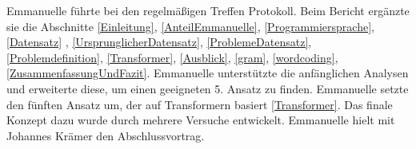 \label{AnteilEmmanuelle}
Emmanuelle führte bei den regelmäßigen Treffen Protokoll. 
Beim Bericht ergänzte sie die Abschnitte \ref{Einleitung}, \ref{AnteilEmmanuelle}, \ref{Programmiersprache}, \ref{Datensatz} , \ref{UrsprunglicherDatensatz}, \ref{ProblemeDatensatz}, \ref{Problemdefinition}, \ref{Transformer}, \ref{Ausblick}, \ref{gram}, \ref{wordcoding}, \ref{ZusammenfassungUndFazit}.
Emmanuelle unterstützte die anfänglichen Analysen und erweiterte diese, um einen geeigneten 5. Ansatz zu finden.
Emmanuelle setzte den fünften Ansatz um, der auf Transformern basiert \ref{Transformer}. Das finale Konzept dazu wurde durch mehrere Versuche entwickelt.
Emmanuelle hielt mit Johannes Krämer den Abschlussvortrag. %

